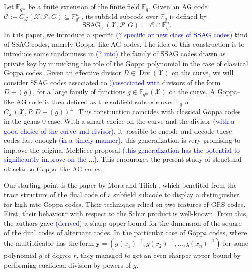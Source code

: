 \documentclass[a4paper]{article}
\theoremstyle{definition}
\theoremstyle{remark}
\newcommand{\calP}{\mathcal{P}}
\newcommand{\calL}{\mathcal{L}}
\newcommand{\calC}{\mathcal{C}}
\newcommand{\calX}{\mathcal{X}}
\newcommand{\fqm}{\mathbb{F}_{q^m}}
\newcommand{\fq}{\mathbb{F}_{q}}
\newcommand{\Div}{\operatorname{Div}}
\newcommand{\ssag}[1]{\operatorname{SSAG}_{q}\left(#1\right)}
\newcommand\sabira[1]{\textcolor{blue}{#1}}
\begin{document}
\medskip

Let $\fqm$ be a finite extension of the finite field $\fq$. Given an AG code $\calC :=C_{\calL}(\calX,\calP,G) \subseteq \fqm^n$, its subfield subcode over $\fq$ is defined by 
$$\ssag{\calX,\calP,G} := \calC \cap \fq^n.$$  
In this paper, we introduce a specific \sabira{(? specific or new class of SSAG codes)} kind of SSAG codes, namely Goppa--like AG codes. The idea of this construction is to introduce  some randomness in \sabira{(? into)} the family of SSAG codes drawn as private key by mimicking the role of the Goppa polynomial in the case of classical Goppa codes. Given an effective divisor $D\in \Div(\calX)$ on the curve, we will consider SSAG codes associated to \sabira{()associated with } divisors of the form $D+(g)$, for a large family of functions $g \in \fqm(\calX)$ on the curve. A Goppa--like AG code is then defined as the subfield subcode over $\fq$ of $C_{\calL}(\calX,P,D+(g))^{\perp}$. This construction coincides with classical Goppa codes in the genus 0 case.%
With a smart choice on the curve and the divisor \sabira{(with a good choice of the curve and divisor)}, it possible to encode and decode these codes fast enough \sabira{(in a timely manner)}, this generalization is very promising to improve the original McEliece proposal \sabira{(this generalization has the potential to significantly improve on the ...)}. This encourages the present study of structural attacks on Goppa--like AG codes. 

Our starting point is the paper by Mora and Tilich \cite{MT21}, which benefited from the trace structure of the dual code of a subfield subcode to display a distinguisher for high rate Goppa codes. Their techniques relied on two features of GRS codes. First, their behaviour with respect to the Schur product is well-known. From this, the authors gave \sabira{(derived)} a sharp upper bound for the dimension of the square of the dual codes of alternant codes. In the particular case of Goppa codes, where the multiplicator has the form $\mathbf{y}=(g(x_1)^{-1},g(x_2)^{-1},\dots,g(x_n)^{-1})$ for some polynomial $g$ of degree $r$, they managed to get an even sharper upper bound by performing euclidean division by powers of $g$.
\end{document}
